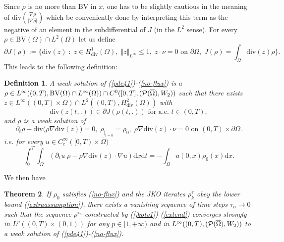 \documentclass[12pt, a4paper]{article}
\numberwithin{equation}{section}
\theoremstyle{plain}
\newtheorem{thm}{Theorem}[section]
\newtheorem{defi}[thm]{Definition}
\theoremstyle{definition}
\theoremstyle{remark}
\newcommand\PP{{\cal P}}
\newcommand{\BV}{\mathrm{BV}}
\newcommand{\dive}{\mathrm{div}}
\newcommand{\Omb}{\overline{\Omega}}
\newcommand\pref[1]{(\ref{#1})}
\begin{document}
Since $\rho$ is no more than $\BV$ in $x$, one has to be slightly cautious in the meaning of  $ \dive( \frac{\nabla \rho}{\vert \nabla \rho \vert}) $ which be conveniently done by interpreting this term as the negative of an element  in the subdifferential of $J$ (in the $L^2$ sense). For every $\rho \in \BV(\Omega)\cap L^2(\Omega)$ let us define
\[\partial J(\rho):=\{\dive(z) \; : \; z\in H^1_{\dive}(\Omega), \; \Vert z \Vert_{L^{\infty}} \le 1, \; z\cdot \nu=0 \mbox{ on $\partial \Omega$}, \;  J(\rho)=\int_{\Omega} \dive(z) \rho\}.\]
This leads to the following definition:
\begin{defi}
A weak solution of \pref{pde41}-\pref{no-flux} is a $\rho \in L^{\infty}((0,T), \BV(\Omega)\cap L^{\infty}(\Omega))\cap C^{0}([0,T], (\PP(\Omb), W_2)) $ such that there exists $z\in L^{\infty}((0,T)\times \Omega)\cap L^2((0,T), H^2_{\dive}(\Omega))$ with  
\begin{equation}\label{condcalibr}
\dive(z(t,.))\in \partial J(\rho(t,.))  \mbox{ for a.e. $t\in (0,T)$},
\end{equation}
and $\rho$ is a weak solution of
\begin{equation}\label{transportzxx}
\partial_t \rho -\dive \Big(\rho   \nabla \dive(z)\Big)   =0, \;  \rho_{\vert_{t=0}}=\rho_0, \; \rho \nabla \dive(z)\cdot \nu=0  \mbox{ on }  (0,T)\times \partial \Omega.
\end{equation}
i.e. for every $u \in C_c^{\infty}([0,T)\times \Omb)$ 
\[\int_0^T \int_\Omega (\partial_t  u \;  \rho-\rho \nabla \dive(z) \cdot \nabla u) \mbox{d}x \mbox{d}t=-\int_\Omega u(0,x) \rho_0(x) \mbox{d} x. \]

\end{defi}

We then have


\begin{thm}
If $\rho_0$ satisfies \pref{no-flux} and the JKO iterates $\rho_k^\tau$ obey the lower bound \pref{extraassumption}, there exists a vanishing sequence of time steps $\tau_n \to 0$ such that the sequence $\rho^{\tau_n}$ constructed by \pref{jkotv1}-\pref{extend} converges strongly in $L^p((0,T)\times (0,1))$ for any $p\in [1, +\infty)$ and in $L^{\infty}((0,T), (\PP(\Omb), W_2))$ to  a weak solution of \pref{pde41}-\pref{no-flux}.
\end{thm}
\end{document}
